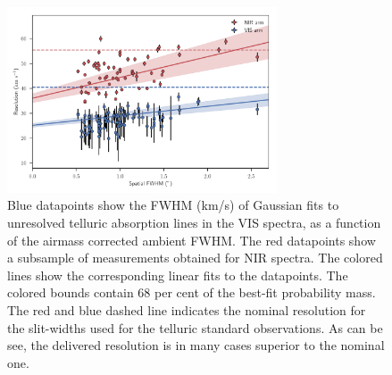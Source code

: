 \documentclass{aa}    %
\begin{document}


\begin{figure}[!ht]
	\centerline{\includegraphics[width=8cm]{figures/resolutuions}} \caption{Blue
		datapoints show the FWHM (km/s) of Gaussian fits to unresolved telluric
		absorption lines in the VIS spectra, as a function of the airmass corrected
		ambient FWHM. The red datapoints show a subsample of measurements obtained for
		NIR spectra. The colored lines show the corresponding linear fits to the
		datapoints. The colored bounds contain 68 per cent of the best-fit probability
		mass. The red and blue dashed line indicates the nominal resolution for the
		slit-widths used for the telluric standard observations. As can be see, the
		delivered resolution is in many cases superior to the nominal one. }
	\label{fig:res}
\end{figure}
\end{document}
